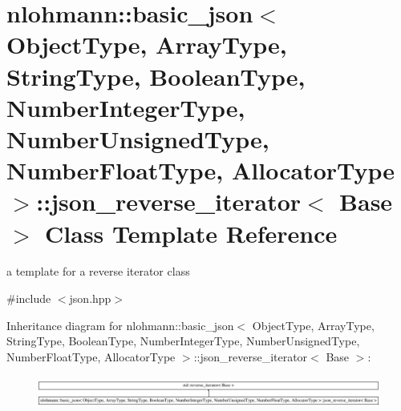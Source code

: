 \hypertarget{classnlohmann_1_1basic__json_1_1json__reverse__iterator}{}\section{nlohmann\+:\+:basic\+\_\+json$<$ Object\+Type, Array\+Type, String\+Type, Boolean\+Type, Number\+Integer\+Type, Number\+Unsigned\+Type, Number\+Float\+Type, Allocator\+Type $>$\+:\+:json\+\_\+reverse\+\_\+iterator$<$ Base $>$ Class Template Reference}
\label{classnlohmann_1_1basic__json_1_1json__reverse__iterator}


a template for a reverse iterator class  




{\ttfamily \#include $<$json.\+hpp$>$}

Inheritance diagram for nlohmann\+:\+:basic\+\_\+json$<$ Object\+Type, Array\+Type, String\+Type, Boolean\+Type, Number\+Integer\+Type, Number\+Unsigned\+Type, Number\+Float\+Type, Allocator\+Type $>$\+:\+:json\+\_\+reverse\+\_\+iterator$<$ Base $>$\+:\begin{figure}[H]
\begin{center}
\leavevmode
\includegraphics[height=1.036078cm]{classnlohmann_1_1basic__json_1_1json__reverse__iterator}
\end{center}
\end{figure}

